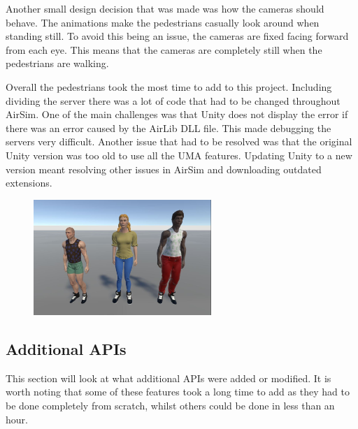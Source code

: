 Another small design decision that was made was how the cameras should behave. The animations make the pedestrians casually look around when standing still. To avoid this being an issue, the cameras are fixed facing forward from each eye. This means that the cameras are completely still when the pedestrians are walking. 

Overall the pedestrians took the most time to add to this project. Including dividing the server there was a lot of code that had to be changed throughout AirSim. One of the main challenges was that Unity does not display the error if there was an error caused by the AirLib DLL file. This made debugging the servers very difficult. Another issue that had to be resolved was that the original Unity version was too old to use all the UMA features. Updating Unity to a new version meant resolving other issues in AirSim and downloading outdated extensions. 
\begin{figure}[H]
    \centering
    \includegraphics[width=0.6\textwidth]{06_Implementation/00_AirSim/Diagrams/RandomPedestrians.JPG}
     \label{06:umaCharacters}
\end{figure}

\subsection{Additional APIs}
This section will look at what additional APIs were added or modified.  It is worth noting that some of these features took a long time to add as they had to be done completely from scratch, whilst others could be done in less than an hour.


